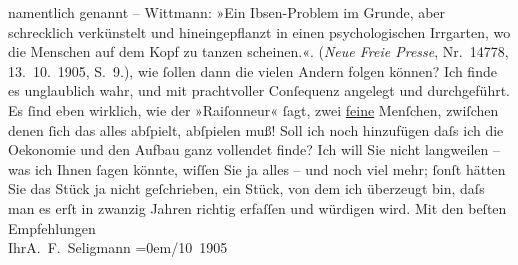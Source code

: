 \begin{ledgroupsized}[t]{13cm}
{{{                        namentlich genannt – Wittmann:
                            »Ein Ibsen-Problem im Grunde,
                            aber schrecklich verkünstelt und hineingepflanzt in einen
                            psychologischen Irrgarten, wo die Menschen auf dem Kopf zu tanzen
                            scheinen.«. (\emph{Neue Freie
                                Presse}, Nr. 14778, 13. 10. 1905,
                            S. 9.)}}}\label{K_L01563_1h}, wie ſollen dann die vielen Andern folgen
                    können? Ich finde es unglaublich wahr, und mit prachtvoller Conſequenz angelegt
                    und durchgeführt. Es ſind eben wirklich, wie der »Raiſonneur« ſagt, zwei \uline{feine} Menſchen, zwiſchen denen ſich das alles
                    abſpielt, abſpielen muß! Soll ich noch hinzufügen daſs ich die Oekonomie und den
                    Aufbau ganz vollendet finde? Ich will Sie nicht langweilen – was ich Ihnen ſagen
                    könnte, wiſſen Sie {\pb}ja alles – und noch viel mehr; ſonſt hätten Sie
                    das Stück ja nicht
                    geſchrieben, ein Stück, von
                    dem ich überzeugt bin, daſs man es erſt in zwanzig Jahren richtig erfaſſen und
                    würdigen wird.\pend
           \pstart
           Mit den beſten Empfehlungen{\\[\baselineskip]}Ihr\spacefill\mbox{A. F. Seligmann}\pend
           \leftskip=0em{}/10 1905\pend
           
         
         \endnumbering{}\end{ledgroupsized}  \newcommand{\dateiname}{L01563}\newcommand{\titel}{Adalbert Seligmann an Arthur Schnitzler, 13. 10. 1905}\newcommand{\editorInnen}{Martin Anton Müller und Gerd-Hermann Susen}
      